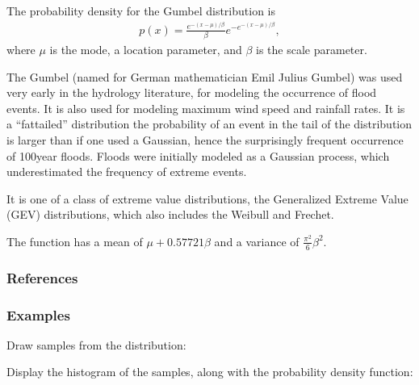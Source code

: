 \documentclass[letterpaper,10pt,english]{sphinxmanual}
\begin{document}
\begin{fulllineitems}
\sphinxAtStartPar
The probability density for the Gumbel distribution is
\begin{equation*}
\begin{split}p(x) = \frac{e^{-(x - \mu)/ \beta}}{\beta} e^{ -e^{-(x - \mu)/
\beta}},\end{split}
\end{equation*}
\sphinxAtStartPar
where \(\mu\) is the mode, a location parameter, and
\(\beta\) is the scale parameter.

\sphinxAtStartPar
The Gumbel (named for German mathematician Emil Julius Gumbel) was used
very early in the hydrology literature, for modeling the occurrence of
flood events. It is also used for modeling maximum wind speed and
rainfall rates.  It is a “fat\sphinxhyphen{}tailed” distribution \sphinxhyphen{} the probability of
an event in the tail of the distribution is larger than if one used a
Gaussian, hence the surprisingly frequent occurrence of 100\sphinxhyphen{}year
floods. Floods were initially modeled as a Gaussian process, which
underestimated the frequency of extreme events.

\sphinxAtStartPar
It is one of a class of extreme value distributions, the Generalized
Extreme Value (GEV) distributions, which also includes the Weibull and
Frechet.

\sphinxAtStartPar
The function has a mean of \(\mu + 0.57721\beta\) and a variance
of \(\frac{\pi^2}{6}\beta^2\).
\subsubsection*{References}
\subsubsection*{Examples}

\sphinxAtStartPar
Draw samples from the distribution:

\begin{sphinxVerbatim}[commandchars=\\\{\}]
     
    
\end{sphinxVerbatim}

\sphinxAtStartPar
Display the histogram of the samples, along with
the probability density function:


\end{fulllineitems}
\end{document}
